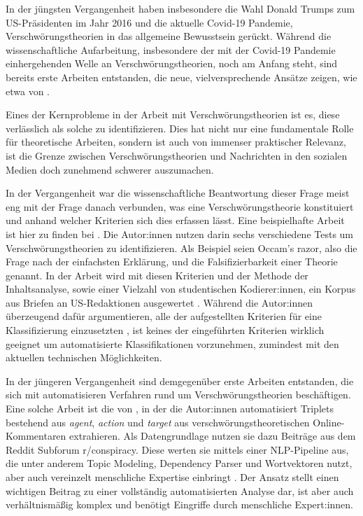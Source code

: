 In der jüngsten Vergangenheit haben insbesondere die Wahl Donald Trumps zum US-Präsidenten im Jahr 2016 und die aktuelle Covid-19 Pandemie, Verschwörungstheorien in das allgemeine Bewusstsein gerückt.
Während die wissenschaftliche Aufarbeitung, insbesondere der mit der Covid-19 Pandemie einhergehenden Welle an Verschwörungstheorien, noch am Anfang steht, sind bereits erste Arbeiten entstanden, die neue, vielversprechende Ansätze zeigen, wie etwa von \textcite{shahsavari_2020}.

Eines der Kernprobleme in der Arbeit mit Verschwörungstheorien ist es, diese verlässlich als solche zu identifizieren.
Dies hat nicht nur eine fundamentale Rolle für theoretische Arbeiten, sondern ist auch von immenser praktischer Relevanz, ist die Grenze zwischen Verschwörungstheorien und Nachrichten in den sozialen Medien doch zunehmend schwerer auszumachen.

In der Vergangenheit war die wissenschaftliche Beantwortung dieser Frage meist eng mit der Frage danach verbunden, was eine Verschwörungstheorie konstituiert und anhand welcher Kriterien sich dies erfassen lässt.
Eine beispielhafte Arbeit ist hier zu finden bei \textcite{uscinski_2014}.
Die Autor:innen nutzen darin sechs verschiedene Tests um Verschwörungstheorien zu identifizieren. Als Beispiel seien Occam's razor, also die Frage nach der einfachsten Erklärung, und die Falsifizierbarkeit einer Theorie genannt.
In der Arbeit wird mit diesen Kriterien und der Methode der Inhaltsanalyse, sowie einer Vielzahl von studentischen Kodierer:innen, ein Korpus aus Briefen an US-Redaktionen ausgewertet \parencite[54ff]{uscinski_2014}.
Während die Autor:innen überzeugend dafür argumentieren, alle der aufgestellten Kriterien für eine Klassifizierung einzusetzten \parencite[52f]{uscinski_2014}, ist keines der eingeführten Kriterien wirklich geeignet um automatisierte Klassifikationen vorzunehmen, zumindest mit den aktuellen technischen Möglichkeiten.

In der jüngeren Vergangenheit sind demgegenüber erste Arbeiten entstanden, die sich mit automatisieren Verfahren rund um Verschwörungstheorien beschäftigen.
Eine solche Arbeit ist die von \textcite{samory_2018}, in der die Autor:innen automatisiert Triplets bestehend aus \textit{agent}, \textit{action} und \textit{target} aus verschwörungstheoretischen Online-Kommentaren extrahieren.
Als Datengrundlage nutzen sie dazu Beiträge aus dem Reddit Subforum r/conspiracy.
Diese werten sie mittels einer NLP-Pipeline aus, die unter anderem Topic Modeling, Dependency Parser und Wortvektoren nutzt, aber auch vereinzelt menschliche Expertise einbringt \parencite[][6ff]{samory_2018}.
Der Ansatz stellt einen wichtigen Beitrag zu einer vollständig automatisierten Analyse dar, ist aber auch verhältnismäßig komplex und benötigt Eingriffe durch menschliche Expert:innen.

